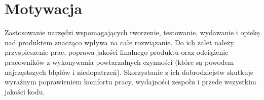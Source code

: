 \section{Motywacja}


Zastosowanie narzędzi wspomagających tworzenie, testowanie, wydawanie i opiekę nad produktem znacząco wpływa na całe rozwiązanie.
Do ich zalet należy przyspieszenie prac, poprawa jakości finalnego produktu oraz odciążenie pracowników z wykonywania powtarzalnych czynności 
(które są powodem najczęstszych błędów i niedopatrzeń).
Skorzystanie z ich dobrodziejstw skutkuje wyraźnym poprawieniem komfortu pracy, wydajności zespołu i przede wszystkim jakości kodu.

